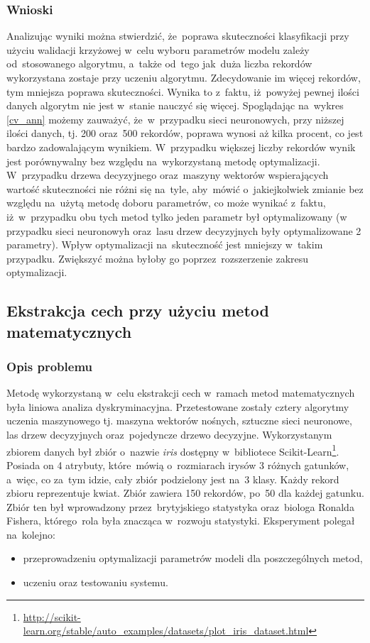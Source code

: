 \subsubsection{Wnioski}
Analizując wyniki można stwierdzić, że~poprawa skuteczności klasyfikacji przy użyciu walidacji krzyżowej w~celu wyboru parametrów modelu zależy od~stosowanego algorytmu, a~także od~tego jak~duża liczba rekordów wykorzystana zostaje przy uczeniu algorytmu. Zdecydowanie im więcej rekordów, tym mniejsza poprawa skuteczności. Wynika to z~faktu, iż~powyżej pewnej ilości danych algorytm nie jest w~stanie nauczyć się więcej. Spoglądając na~wykres \ref{cv_ann} możemy zauważyć, że~w~przypadku sieci neuronowych, przy niższej ilości danych, tj. 200 oraz~500 rekordów, poprawa wynosi aż kilka procent, co jest bardzo zadowalającym wynikiem. W~przypadku większej liczby rekordów wynik jest porównywalny bez względu na~wykorzystaną metodę optymalizacji. W~przypadku drzewa decyzyjnego oraz~maszyny wektorów wspierających wartość skuteczności nie różni się na~tyle, aby~mówić o~jakiejkolwiek zmianie bez względu na~użytą metodę doboru parametrów, co może wynikać z~faktu, iż~w~przypadku obu tych metod tylko jeden parametr był optymalizowany (w przypadku sieci neuronowyh oraz~lasu drzew decyzyjnych były optymalizowane 2 parametry). Wpływ optymalizacji na~skuteczność jest mniejszy w~takim przypadku. Zwiększyć można byłoby go poprzez~rozszerzenie zakresu optymalizacji.

\subsection{Ekstrakcja cech przy użyciu metod matematycznych}

\subsubsection{Opis problemu}
Metodę wykorzystaną w~celu ekstrakcji cech w~ramach metod matematycznych była liniowa analiza dyskryminacyjna. Przetestowane zostały cztery algorytmy uczenia maszynowego tj. maszyna wektorów nośnych, sztuczne sieci neuronowe, las drzew decyzyjnych oraz~pojedyncze drzewo decyzyjne. Wykorzystanym zbiorem danych był zbiór o~nazwie \textit{iris} dostępny w~bibliotece Scikit-Learn\footnote{\url{http://scikit-learn.org/stable/auto_examples/datasets/plot_iris_dataset.html}}. Posiada on 4 atrybuty, które~mówią o~rozmiarach irysów 3 różnych gatunków, a~więc, co za~tym idzie, cały zbiór podzielony jest na~3 klasy. Każdy rekord zbioru reprezentuje kwiat. Zbiór zawiera 150 rekordów, po~50 dla każdej gatunku. Zbiór ten był wprowadzony przez~brytyjskiego statystyka oraz~biologa Ronalda Fishera, którego~rola była znacząca w~rozwoju statystyki. Eksperyment polegał na~kolejno:
\begin{itemize}

\item przeprowadzeniu optymalizacji parametrów modeli dla poszczególnych metod,
\item uczeniu oraz testowaniu systemu.

\end{itemize}

